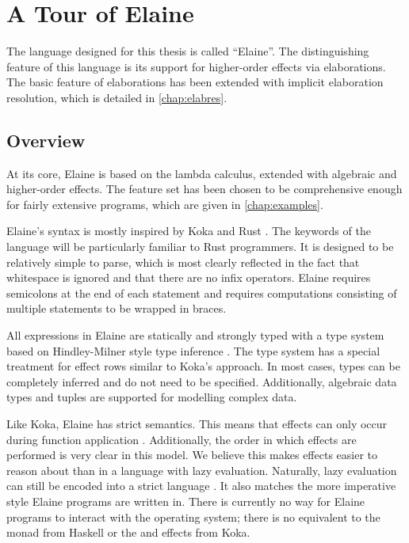 \chapter{A Tour of Elaine}\label{chap:basics}

The language designed for this thesis is called ``Elaine''. The distinguishing feature of this language is its support for higher-order effects via elaborations. The basic feature of elaborations has been extended with implicit elaboration resolution, which is detailed in \cref{chap:elabres}.

\section{Overview}

At its core, Elaine is based on the lambda calculus, extended with algebraic and higher-order effects. The feature set has been chosen to be comprehensive enough for fairly extensive programs, which are given in \cref{chap:examples}.

Elaine's syntax is mostly inspired by Koka \autocite{leijen_koka_2014,leijen_type_2017} and Rust \autocite{matsakis_rust_2014}. The keywords of the language will be particularly familiar to Rust programmers. It is designed to be relatively simple to parse, which is most clearly reflected in the fact that whitespace is ignored and that there are no infix operators. Elaine requires semicolons at the end of each statement and requires computations consisting of multiple statements to be wrapped in braces.

All expressions in Elaine are statically and strongly typed with a type system based on Hindley-Milner style type inference \autocite{hindley_principal_1969,milner_theory_1978}. The type system has a special treatment for effect rows similar to Koka's approach. In most cases, types can be completely inferred and do not need to be specified. Additionally, algebraic data types and tuples are supported for modelling complex data.

Like Koka, Elaine has strict semantics. This means that effects can only occur during function application \autocite{leijen_koka_2014}. Additionally, the order in which effects are performed is very clear in this model. We believe this makes effects easier to reason about than in a language with lazy evaluation. Naturally, lazy evaluation can still be encoded into a strict language \autocite{wadler_lazy_1996}. It also matches the more imperative style Elaine programs are written in. There is currently no way for Elaine programs to interact with the operating system; there is no equivalent to the  monad from Haskell or the  and  effects from Koka.

